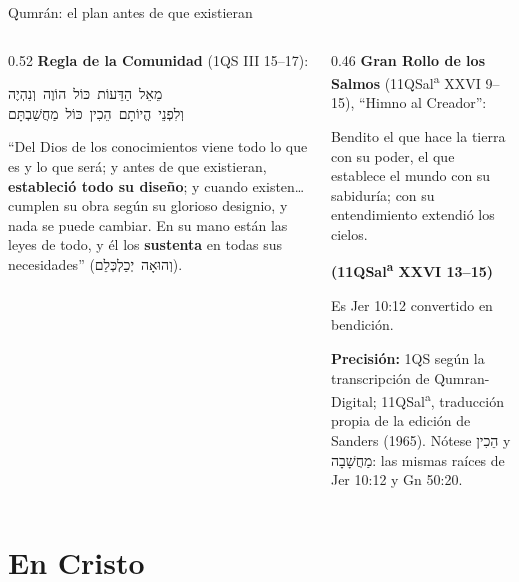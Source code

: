 \documentclass[hyperref={bookmarks=false},aspectratio=169]{beamer}
\newcommand{\heb}[1]{\mbox{\foreignlanguage{hebrew}{#1}}}
\newcommand{\fuente}[1]{\par\hfill{\upshape\bfseries\footnotesize\textcolor{azul}{#1}}}
\newcommand{\destacar}[1]{\textbf{\textcolor{azul}{#1}}}
\newcommand{\precision}[1]{{\footnotesize\color{gris}\textbf{Precisión:} #1}}
\begin{document}
\begin{frame}{Qumrán: el plan antes de que existieran}
\begin{columns}[t,onlytextwidth]
\begin{column}{0.52\textwidth}\small
\textbf{Regla de la Comunidad} (1QS III 15--17):
\begin{center}\heb{מֵאֵל הַדֵּעוֹת כּוֹל הוֹוֶה וְנִהְיֶה}\\ \heb{וְלִפְנֵי הֱיוֹתָם הֵכִין כּוֹל מַחֲשַׁבְתָּם}\end{center}
``Del Dios de los conocimientos viene todo lo que es y lo que será; y antes de que existieran, \destacar{estableció todo su diseño}; y cuando existen\ldots{} cumplen su obra según su glorioso designio, y nada se puede cambiar. En su mano están las leyes de todo, y él los \destacar{sustenta} en todas sus necesidades'' (\heb{וְהוּאָה יְכַלְכְּלֵם}).
\end{column}
\begin{column}{0.46\textwidth}\small
\textbf{Gran Rollo de los Salmos} (11QSal\textsuperscript{a} XXVI 9--15), ``Himno al Creador'':\par\smallskip
\begin{cita}Bendito el que hace la tierra con su poder, el que establece el mundo con su sabiduría; con su entendimiento extendió los cielos.\fuente{(11QSal\textsuperscript{a} XXVI 13--15)}\end{cita}
\scriptsize Es Jer 10:12 convertido en bendición.\par\smallskip
\precision{1QS según la transcripción de Qumran-Digital; 11QSal\textsuperscript{a}, traducción propia de la edición de Sanders (1965). Nótese \heb{הֵכִין} y \heb{מַחֲשָׁבָה}: las mismas raíces de Jer 10:12 y Gn 50:20.}
\end{column}
\end{columns}
\end{frame}

\section{En Cristo}
\end{document}
